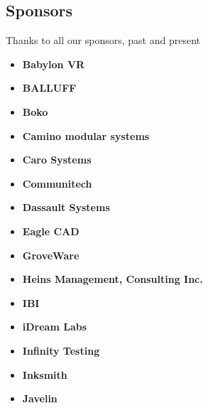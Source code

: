 \documentclass[main.tex]{subfiles}
\begin{document}
\begin{flushleft}
\subsection{Sponsors}
Thanks to all our sponsors, past and present

\begin{multicols}{3}
    \begin{itemize}[label={},noitemsep]
    \item \textbf{Babylon VR}
    \item \textbf{BALLUFF}
    \item \textbf{Boko}
    \end{itemize}
\end{multicols}

\begin{multicols}{3}
\begin{itemize}[label={},noitemsep]
    \item \textbf{Camino modular systems}
    \item \textbf{Caro Systems}
    \item \textbf{Communitech}
    \end{itemize}
\end{multicols}

\begin{multicols}{3}
\begin{itemize}[label={},noitemsep]
    \item \textbf{Dassault Systems}
    \item \textbf{Eagle CAD}
    \item \textbf{GroveWare}
    \end{itemize}
\end{multicols}

\begin{multicols}{3}
\begin{itemize}[label={},noitemsep]
    \item \textbf{Heins Management, Consulting Inc.}
    \item \textbf{IBI}
    \item \textbf{iDream Labs}
    \end{itemize}
\end{multicols}

\begin{multicols}{3}
\begin{itemize}[label={},noitemsep]
    \item \textbf{Infinity Testing}
    \item \textbf{Inksmith}
    \item \textbf{Javelin}
    \end{itemize}
\end{multicols}


\end{flushleft}
\end{document}

